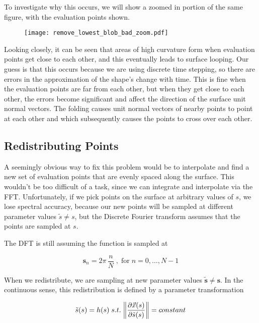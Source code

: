 To investigate why this occurs, we will show a zoomed in portion of the same figure, with the evaluation points shown. 

\begin{figure}[H]
    \begin{center}
      \texttt{[image: remove\_lowest\_blob\_bad\_zoom.pdf]}
    \end{center}
  \vspace{-.2in} %
  \caption{\label{fig:remove-lowest-blog-bad-zoom}}
\end{figure}

Looking closely, it can be seen that areas of high curvature form when evaluation points get close to each other, and this eventually leads to surface looping. Our guess is that this occurs because we are using discrete time stepping, so there are errors in the approximation of the shape's change with time. This is fine when the evaluation points are far from each other, but when they get close to each other, the errors become significant and affect the direction of the surface unit normal vectors. The folding causes unit normal vectors of nearby points to point at each other and which subsequently causes the points to cross over each other.

\subsection*{Redistributing Points}

A seemingly obvious way to fix this problem would be to interpolate and find a new set of evaluation points that are evenly spaced along the surface. This wouldn't be too difficult of a task, since we can integrate and interpolate via the FFT. Unfortunately, if we pick points on the surface at arbitrary values of $s$, we lose spectral accuracy, because our new points will be sampled at different parameter values $\tilde{s} \ne s$, but the Discrete Fourier transform assumes that the points are sampled at $s$. 


The DFT is still assuming the function is sampled at

\[ \boldsymbol{s}_n = 2 \pi \, \frac{n}{N} \; , \; \text{for} \; n = 0, \dotsc, N-1 \]  

When we redistribute, we are sampling at new parameter values $\boldsymbol{\tilde{s}} \ne \boldsymbol{s}$. In the continuous sense, this redistribution is defined by a parameter transformation

\[ 
  \tilde{s}(s) = h(s) \; s.t. \; \norm{\frac{\partial \vec{x}(s)}{\partial \tilde{s}(s)}} = constant
\]

